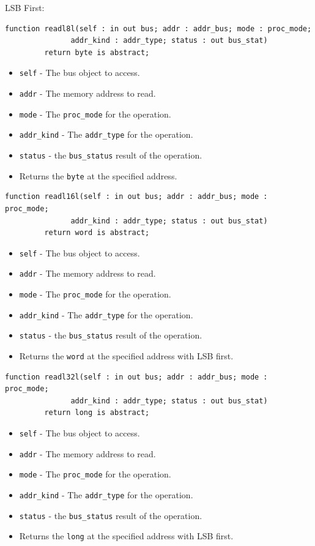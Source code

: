 \documentclass[10pt, openany]{book}
\newcommand{\keyword}[1]{\texttt{#1}}
\newcommand{\datatype}[1]{\texttt{#1}}
\begin{document}
LSB First:
\begin{lstlisting}
function readl8l(self : in out bus; addr : addr_bus; mode : proc_mode;
               addr_kind : addr_type; status : out bus_stat)
         return byte is abstract;
\end{lstlisting}
\begin{itemize}
  \item \keyword{self} - The bus object to access.
  \item \keyword{addr} - The memory address to read.
  \item \keyword{mode} - The \datatype{proc\_mode} for the operation.
  \item \keyword{addr\_kind} - The \datatype{addr\_type} for the operation.
  \item \keyword{status} - the \datatype{bus\_status} result of the operation.
  \item Returns the \datatype{byte} at the specified address.
\end{itemize}

\begin{lstlisting}
function readl16l(self : in out bus; addr : addr_bus; mode : proc_mode;
               addr_kind : addr_type; status : out bus_stat)
         return word is abstract;
\end{lstlisting}
\begin{itemize}
  \item \keyword{self} - The bus object to access.
  \item \keyword{addr} - The memory address to read.
  \item \keyword{mode} - The \datatype{proc\_mode} for the operation.
  \item \keyword{addr\_kind} - The \datatype{addr\_type} for the operation.
  \item \keyword{status} - the \datatype{bus\_status} result of the operation.
  \item Returns the \datatype{word} at the specified address with LSB first.
\end{itemize}

\begin{lstlisting}
function readl32l(self : in out bus; addr : addr_bus; mode : proc_mode;
               addr_kind : addr_type; status : out bus_stat)
         return long is abstract;
\end{lstlisting}
\begin{itemize}
  \item \keyword{self} - The bus object to access.
  \item \keyword{addr} - The memory address to read.
  \item \keyword{mode} - The \datatype{proc\_mode} for the operation.
  \item \keyword{addr\_kind} - The \datatype{addr\_type} for the operation.
  \item \keyword{status} - the \datatype{bus\_status} result of the operation.
  \item Returns the \datatype{long} at the specified address with LSB first.
\end{itemize}
\end{document}
